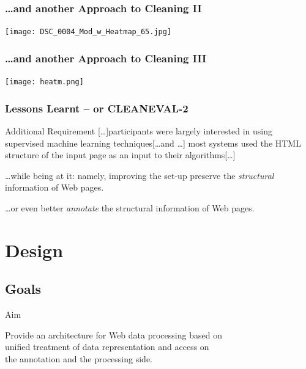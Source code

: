\documentclass{beamer}
\begin{document}
    \begin{frame}
    \frametitle{\ldots and another Approach to Cleaning II}
        \begin{center}
            \texttt{[image: DSC\_0004\_Mod\_w\_Heatmap\_65.jpg]}
        \end{center}
    \end{frame}

    \begin{frame}
    \frametitle{\ldots and another Approach to Cleaning III}
        \begin{center}
            \texttt{[image: heatm.png]}
        \end{center}
    \end{frame}


    \begin{frame}
    \frametitle{Lessons Learnt -- or CLEANEVAL-2}
        \begin{block}{Additional Requirement}
            [\ldots]participants were largely interested in using supervised machine learning techniques[\ldots and \ldots] most systems used the HTML structure of the input page as an input to their algorithms[\ldots]
        \end{block}

\pause

        \begin{block}{\ldots while being at it: namely, improving the set-up}
            preserve the \textit{structural} information of Web pages. 
        \end{block}
	
\pause
	
        \begin{block}{\ldots or even better}
            \textit{annotate} the structural information of Web pages. 
        \end{block}
    \end{frame}


\section{Design}
    \subsection{Goals}
    \begin{frame}{Aim}
            \begin{block}{}
                Provide an architecture for Web data processing based on \\
                unified treatment of data representation and access on \\ 
                the annotation and the processing side.
            \end{block}
        \end{frame}
\end{document}
